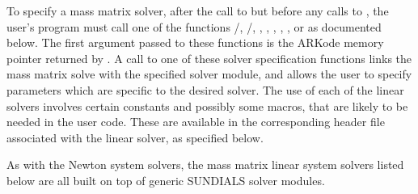 \documentclass[letterpaper,10pt,english]{sphinxmanual}
\begin{document}
To specify a mass matrix solver, after the call to
{\hyperref[c_interface/User_callable:c.ARKodeCreate]{\emph{}}} but before any calls to {\hyperref[c_interface/User_callable:c.ARKode]{\emph{}}},
the user's program must call one of the functions
{\hyperref[c_interface/User_callable:c.ARKMassDense]{\emph{}}}/{\hyperref[c_interface/User_callable:c.ARKMassLapackDense]{\emph{}}},
{\hyperref[c_interface/User_callable:c.ARKMassBand]{\emph{}}}/{\hyperref[c_interface/User_callable:c.ARKMassLapackBand]{\emph{}}},
{\hyperref[c_interface/User_callable:c.ARKMassKLU]{\emph{}}}, {\hyperref[c_interface/User_callable:c.ARKMassSuperLUMT]{\emph{}}},
{\hyperref[c_interface/User_callable:c.ARKMassSpgmr]{\emph{}}}, {\hyperref[c_interface/User_callable:c.ARKMassSpbcg]{\emph{}}},
{\hyperref[c_interface/User_callable:c.ARKMassSptfqmr]{\emph{}}}, {\hyperref[c_interface/User_callable:c.ARKMassSpfgmr]{\emph{}}} or
{\hyperref[c_interface/User_callable:c.ARKMassPcg]{\emph{}}} as documented below. The first argument passed
to these functions is the ARKode memory pointer returned by
{\hyperref[c_interface/User_callable:c.ARKodeCreate]{\emph{}}}. A call to one of these solver specification
functions links the mass matrix solve with the specified solver
module, and allows the user to specify parameters which are specific
to the desired solver.  The use of each of the linear solvers involves
certain constants and possibly some macros, that are likely to be
needed in the user code. These are available in the corresponding
header file associated with the linear solver, as specified below.

As with the Newton system solvers, the mass matrix linear system
solvers listed below are all built on top of generic SUNDIALS solver
modules.
\end{document}
